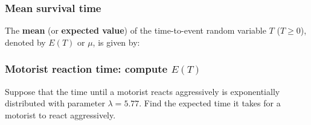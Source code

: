 \begin{frame}
\frametitle{Mean survival time}
The \textbf{mean} (or \textbf{expected value}) of the time-to-event random variable $T$ ($T \geq 0$), denoted by $E(T)$ or $\mu$, is given by:
\vskip100pt
\end{frame}

\begin{frame}
\frametitle{Motorist reaction time: compute $E(T)$}
Suppose that the time until a motorist reacts aggressively is exponentially distributed with parameter $\lambda=5.77$.  Find the expected time it takes for a motorist to react aggressively.
\vskip150pt


\end{frame}

